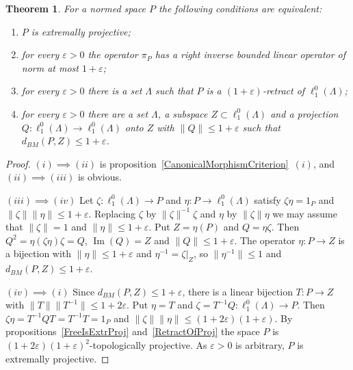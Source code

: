 \documentclass[12pt]{article}
\newtheorem{theorem}{Theorem}[section]
\newcommand{\lo}[1]{\ell_1^0(#1)}
\newcommand{\norm}[1]{\lVert #1\rVert}
\renewcommand{\Im}{\operatorname{Im}}
\newcommand{\BM}{d_{BM}}
\begin{document}
\begin{theorem}\label{ExtrProjCriterion} For a normed space $P$ the following
    conditions are equivalent:
    \begin{enumerate}[label = (\roman*)]
        \item $P$ is extremally projective;
        \item for every $\varepsilon>0$ the operator $\pi_P$ has a right
              inverse bounded linear operator of norm at most $1+\varepsilon$;
        \item for every $\varepsilon>0$ there is a set $\Lambda$ such that $P$
              is a $(1+\varepsilon)$-retract of $\lo{\Lambda}$;
        \item for every $\varepsilon>0$ there are a set $\Lambda$, a subspace
              $Z\subset\lo{\Lambda}$ and a projection $Q:\lo{\Lambda}\to\lo{\Lambda}$
              onto $Z$ with $\norm{Q}\leq 1+\varepsilon$ such that
              $\BM(P,Z)\leq 1+\varepsilon$.
    \end{enumerate}
\end{theorem}
\begin{proof} $(i)\implies(ii)$ is proposition~\ref{CanonicalMorphismCriterion}~$(i)$,
    and $(ii)\implies(iii)$ is obvious.

    $(iii)\implies(iv)$ Let $\zeta:\lo{\Lambda}\to P$ and $\eta:P\to\lo{\Lambda}$
    satisfy $\zeta\eta=1_P$ and $\norm{\zeta}\norm{\eta}\leq 1+\varepsilon$. Replacing
    $\zeta$ by $\norm{\zeta}^{-1}\zeta$ and $\eta$ by $\norm{\zeta}\eta$ we may
    assume that $\norm{\zeta}=1$ and $\norm{\eta}\leq 1+\varepsilon$. Put
    $Z=\eta(P)$ and $Q=\eta\zeta$. Then $Q^2=\eta(\zeta\eta)\zeta=Q$,
    $\Im(Q)=Z$ and $\norm{Q}\leq 1+\varepsilon$. The operator $\eta:P\to Z$
    is a bijection with $\norm{\eta}\leq 1+\varepsilon$ and
    $\eta^{-1}=\zeta|_Z$, so $\norm{\eta^{-1}}\leq 1$ and
    $\BM(P,Z)\leq 1+\varepsilon$.

    $(iv)\implies(i)$ Since $\BM(P,Z)\leq 1+\varepsilon$, there is a linear
    bijection $T:P\to Z$ with $\norm{T}\norm{T^{-1}}\leq 1+2\varepsilon$. Put
    $\eta=T$ and $\zeta=T^{-1}Q:\lo{\Lambda}\to P$. Then
    $\zeta\eta=T^{-1}QT=T^{-1}T=1_P$ and
    $\norm{\zeta}\norm{\eta}\leq(1+2\varepsilon)(1+\varepsilon)$. By
    propositions~\ref{FreeIsExtrProj} and~\ref{RetractOfProj} the space $P$ is
    $(1+2\varepsilon)(1+\varepsilon)^2$-topologically projective. As
    $\varepsilon>0$ is arbitrary, $P$ is extremally projective.
\end{proof}
\end{document}
